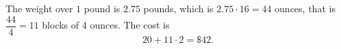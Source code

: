 The weight over $1$ pound is $2.75$ pounds, which is $2.75\cdot16=44$ ounces, that is $\dfrac{44}{4}=11$ blocks of $4$ ounces. The cost is
\[
20+11\cdot2=\boxed{\$42}.
\]
